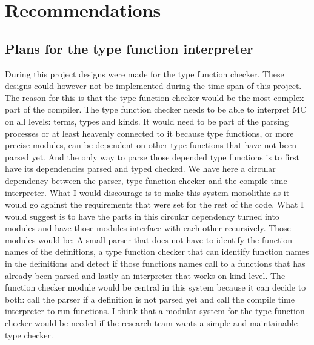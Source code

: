 \section{Recommendations}

\subsection{Plans for the type function interpreter}
During this project designs were made for the type function checker. These designs could however not be implemented during the time span of this project. The reason for this is that the type function checker would be the most complex part of the compiler. The type function checker needs to be able to interpret MC on all levels: terms, types and kinds. It would need to be part of the parsing processes or at least heavenly connected to it because type functions, or more precise modules, can be dependent on other type functions that have not been parsed yet. And the only way to parse those depended type functions is to first have its dependencies parsed and typed checked. We have here a circular dependency between the parser, type function checker and the compile time interpreter.
What I would discourage is to make this system monolithic as it would go against the requirements that were set for the rest of the code. What I would suggest is to have the parts in this circular dependency turned into modules and have those modules interface with each other recursively. Those modules would be: A small parser that does not have to identify the function names of the definitions, a type function checker that can identify function names in the definitions and detect if those functions names call to a functions that has already been parsed and lastly an interpreter that works on kind level.
The function checker module would be central in this system because it can decide to both: call the parser if a definition is not parsed yet and call the compile time interpreter to run functions.
I think that a modular system for the type function checker would be needed if the research team wants a simple and maintainable type checker.